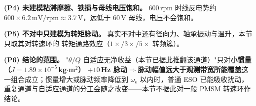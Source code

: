 \documentclass[11pt]{article}
\theoremstyle{remark}\newtheorem{remark}{注}
\begin{document}
\noindent\textbf{(P4) 未建模粘滞摩擦、铁损与母线电压饱和。} $600$\,rpm 时线反电势约
$600\times6.2\,\mathrm{mV/rpm}\approx3.7$\,V，远低于 $60$\,V 母线，电压不会饱和。
\vspace{1mm}

\noindent\textbf{(P5) 不对中只建模为转矩脉动。} 真实不对中还有径向力、轴承振动与温升，本节只取其对转速环的
转矩通路效应（$1\times/3\times/5\times$ 转频簇）。
\vspace{1mm}

\noindent\textbf{(P6) 结论的范围。} "$\theta/Q$ 自适应无净收益（本节已据此推翻该通道）"只对\textbf{小惯量（$J=1.89\times10^{-5}$\,kg$\cdot$m$^2$）
$+10$\,Hz 脉动$\Rightarrow$脉动幅值远大于观测带宽所能覆盖}这一组合成立；惯量增大或脉动频率降低到
$\omega_o$ 以内时，普通 ESO 已能吸收扰动，重复通道与自适应通道的分工会随之改变——本节不据此对一般 PMSM
转速环作结论。
\vspace{1mm}
\end{document}
